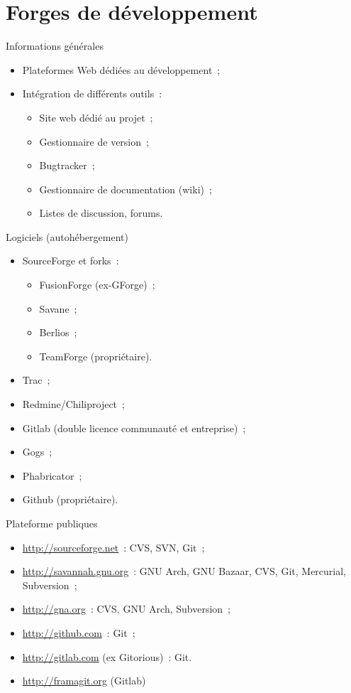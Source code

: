 \section{Forges de développement}

\begin{frame}{Informations générales}
\begin{itemize}
 \item Plateformes Web dédiées au développement~;
 \pause
 \item Intégration de différents outils~:
 \begin{itemize}
  \pause
  \item Site web dédié au projet~;
  \pause
  \item Gestionnaire de version~;
  \pause
  \item Bugtracker~;
  \pause
  \item Gestionnaire de documentation (wiki)~;
  \pause
  \item Listes de discussion, forums.
 \end{itemize}
\end{itemize}
\end{frame}

\begin{frame}{Logiciels (autohébergement)}
\begin{itemize}
 \item SourceForge et forks~:
  \pause
 \begin{itemize}
  \item FusionForge (ex-GForge)~;
  \pause
  \item Savane~;
  \pause
  \item Berlios~;
  \pause
  \item TeamForge (propriétaire).
 \end{itemize}
 \item Trac~;
  \pause
 \item Redmine/Chiliproject~;
  \pause
 \item Gitlab (double licence communauté et entreprise)~;
  \pause
 \item Gogs~;
  \pause
 \item Phabricator~;
  \pause
 \item Github (propriétaire).
\end{itemize}
\end{frame}

\begin{frame}[fragile]{Plateforme publiques}
\begin{itemize}
 \item \url{http://sourceforge.net}~: CVS, SVN, Git~;
 \pause
 \item \url{http://savannah.gnu.org}~: GNU Arch, GNU Bazaar, CVS, Git, Mercurial, Subversion~;
 \pause
 \item \url{http://gna.org}~: CVS, GNU Arch, Subversion~;
 \pause
 \item \url{http://github.com}~: Git~;
 \pause
 \item \url{http://gitlab.com} (ex Gitorious)~: Git.
 \pause
 \item \url{http://framagit.org} (Gitlab)
\end{itemize}
\end{frame}

